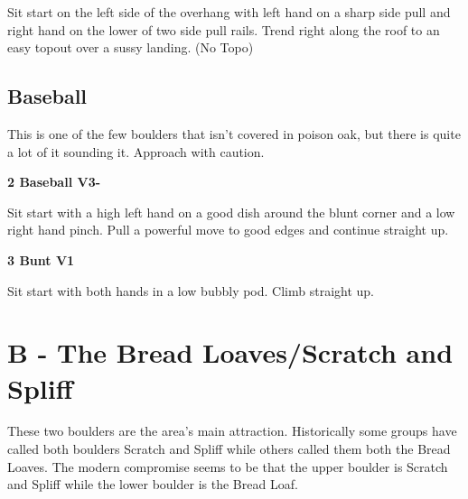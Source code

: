 \begin{multicols}{2}
			\begin{adjustwidth}{0.5cm}{}			
			Sit start on the left side of the overhang with left hand on a sharp side pull and right hand on the lower of two side pull rails. Trend right along the roof to an easy topout over a sussy landing. (No Topo)
			\end{adjustwidth}
			
			
		


		\needspace{1.5cm}
		\subsection*{Baseball}\label{bf:Baseball}
		This is one of the few boulders that isn't covered in poison oak, but there is quite a lot of it sounding it. Approach with caution.\\
	
		
			
			\needspace{1.5cm}
\label{rt:Baseball}
\colorbox{green!20}{
\parbox{0.95\linewidth}{
\textbf{
2 Baseball V3-  
}}}

			\begin{adjustwidth}{0.5cm}{}			
			Sit start with a high left hand on a good dish around the blunt corner and a low right hand pinch. Pull a powerful move to good edges and continue straight up.
			\end{adjustwidth}
			
			
			
			\needspace{1.5cm}
\label{rt:Bunt}
\colorbox{green!20}{
\parbox{0.95\linewidth}{
\textbf{
3 Bunt V1  
}}}

			\begin{adjustwidth}{0.5cm}{}			
			Sit start with both hands in a low bubbly pod. Climb straight up.
			\end{adjustwidth}
			
			
		
	
\newpage


		\section{B - The Bread Loaves/Scratch and Spliff}\label{sa:The Bread Loaves/Scratch and Spliff}
	These two boulders are the area's main attraction. Historically some groups have called both boulders Scratch and Spliff while others called them both the Bread Loaves. The modern compromise seems to be that the upper boulder is Scratch and Spliff while the lower boulder is the Bread Loaf.\\


\end{multicols}
